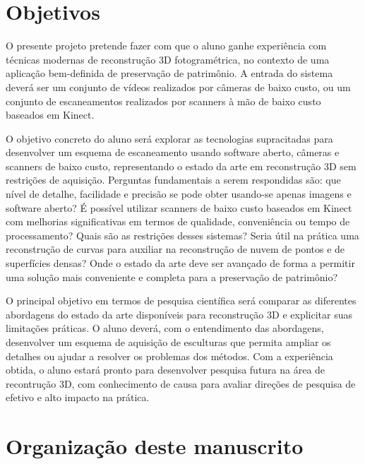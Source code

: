 \section{Objetivos}

O presente projeto pretende fazer com que o aluno ganhe experiência com técnicas
modernas de reconstrução 3D fotogramétrica, no contexto de uma aplicação
bem-definida de preservação de patrimônio. A entrada do sistema deverá ser um
conjunto de vídeos realizados por câmeras de baixo custo, ou um conjunto de
escaneamentos realizados por scanners à mão de baixo custo baseados em Kinect.

O objetivo concreto do aluno será explorar as tecnologias supracitadas para
desenvolver um esquema de escaneamento usando software aberto, câmeras e
scanners de baixo custo, representando o estado da arte em reconstrução 3D sem
restrições de aquisição. Perguntas fundamentais a serem respondidas são: que
nível de detalhe, facilidade e precisão se pode obter usando-se apenas imagens e software
aberto? É possível utilizar scanners de baixo custo baseados em Kinect com
melhorias significativas em termos de qualidade, conveniência ou tempo de
processamento?  Quais são as restrições desses sistemas? Seria útil na prática
uma reconstrução de curvas para auxiliar na reconstrução de nuvem de pontos e de
superfícies densas? Onde o estado da arte deve ser avançado de forma a permitir
uma solução mais conveniente e completa para a preservação de patrimônio?

O principal objetivo em termos de pesquisa científica será comparar as
diferentes abordagens do estado da arte disponíveis para reconstrução 3D e
explicitar suas limitações práticas. O aluno deverá, com o entendimento das
abordagens, desenvolver um esquema de aquisição de esculturas que permita
ampliar os detalhes ou ajudar a resolver os problemas dos métodos. Com a
experiência obtida, o aluno estará pronto para desenvolver pesquisa futura na
área de recontrução 3D, com conhecimento de causa para avaliar direções de
pesquisa de efetivo e alto impacto na prática.

\section{Organização deste manuscrito}

